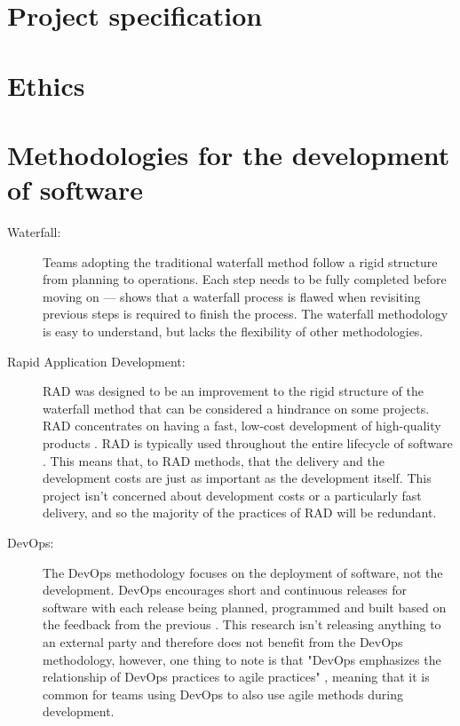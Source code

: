 \documentclass[11pt, a4paper]{report}
\begin{document}
\cleardoublepage
\begin{appendices}

\chapter{Project specification}


\chapter{Ethics}



\chapter{Methodologies for the development of software}
\label{appendix:softwareDevelopmentMethodologies}

\begin{description}

  \item[Waterfall:] Teams adopting the traditional waterfall method follow a rigid structure from planning to operations. Each step needs to be fully completed before moving on --- \citeauthor{royce1987managing} \parencite*[330]{royce1987managing} shows that a waterfall process is flawed when revisiting previous steps is required to finish the process. The waterfall methodology is easy to understand, but lacks the flexibility of other methodologies.
   
  \item[Rapid Application Development:] RAD was designed to be an improvement to the rigid structure of the waterfall method that can be considered a hindrance on some projects. RAD concentrates on having a fast, low-cost development of high-quality products \parencite{martin1991rapid}. RAD is typically used throughout the entire lifecycle of software \parencite[211]{beynon1999rapid}. This means that, to RAD methods, that the delivery and the development costs are just as important as the development itself. This project isn't concerned about development costs or a particularly fast delivery, and so the majority of the practices of RAD will be redundant.
   
  \item[DevOps:] The DevOps methodology focuses on the deployment of software, not the development. DevOps encourages short and continuous releases for software with each release being planned, programmed and built based on the feedback from the previous \parencite{bass2015devops}. This research isn't releasing anything to an external party and therefore does not benefit from the DevOps methodology, however, one thing to note is that "DevOps emphasizes the relationship of DevOps practices to agile practices" \parencite[15]{bass2015devops}, meaning that it is common for teams using DevOps to also use agile methods during development.


\end{description}
\end{appendices}
\end{document}
